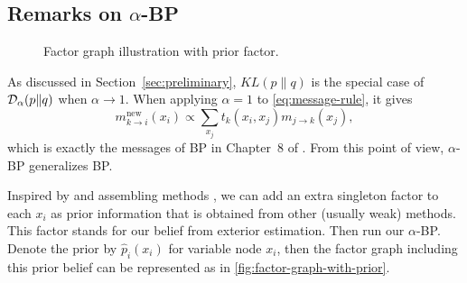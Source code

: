 \documentclass[conference]{IEEEtran}
\begin{document}
\subsection{Remarks on $\alpha$-BP}\label{subsec:remark}
\begin{figure}[!ht]
  \begin{centering}
    \caption{Factor graph illustration with prior factor.}\label{fig:factor-graph-with-prior}
    \vspace{0.1cm}
  \end{centering}
\end{figure}

As discussed in Section~\ref{sec:preliminary}, $KL(p\|q)$ is the special case of $\mathcal{D}_{\alpha}(p\|q)$ when $\alpha \rightarrow 1$. When applying $\alpha=1$ to \autoref{eq:message-rule}, it gives
\begin{equation}
  {m}^{\text{new}}_{k\rightarrow i}(x_i) \propto \sum_{x_j} t_k(x_i, x_j) m_{j \rightarrow k}(x_j),
\end{equation}
which is exactly the messages of BP in Chapter~$8$ of \cite{Bishop:2006:PRM:1162264}. From this point of view, $\alpha$-BP generalizes BP.

Inspired by \cite{pseudo_priorBP2010} and assembling methods \cite{James:2014:ISL:2517747}, we can add an extra singleton factor to each $x_i$ as prior information that is obtained from other (usually weak) methods. This factor stands for our belief from exterior estimation. Then run our $\alpha$-BP. Denote the prior by $\hat{p}_i(x_i)$ for variable node $x_i$, then the factor graph including this prior belief can be represented as in \autoref{fig:factor-graph-with-prior}.
\end{document}
